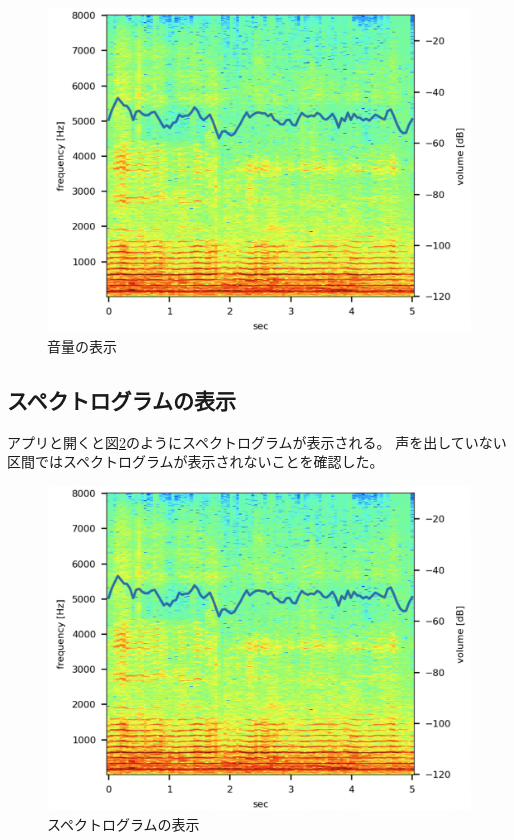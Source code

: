 \documentclass[a4paper,11pt]{jsarticle}
\begin{document}
\begin{figure}[h]
\centering
\includegraphics[keepaspectratio, width=13cm]
{./images/work3_spec_volume.png}
\caption{音量の表示}
\label{fig:volume}
\end{figure}

\subsection{スペクトログラムの表示}
アプリと開くと図\ref{fig:spec}のようにスペクトログラムが表示される。
声を出していない区間ではスペクトログラムが表示されないことを確認した。

\begin{figure}[h]
\centering
\includegraphics[keepaspectratio, width=13cm]
{./images/work3_spec_volume.png}
\caption{スペクトログラムの表示}
\label{fig:spec}
\end{figure}
\end{document}
